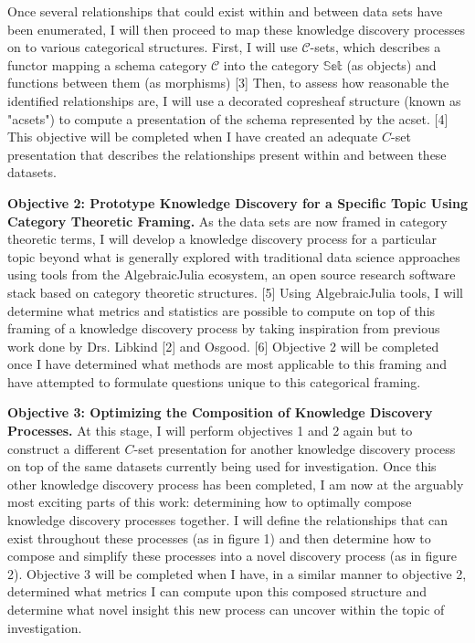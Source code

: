 \documentclass[11pt]{extarticle}
\begin{document}
Once several relationships that could exist within and between data sets have been enumerated, I will then proceed to map these knowledge discovery processes on to various categorical structures.
First, I will use $\mathscr{C}$-sets, which describes a functor mapping a schema category $\mathscr{C}$ into the category $\mathbb{Set}$ (as objects) and functions between them (as morphisms) [3]
Then, to assess how reasonable the identified relationships are, I will use a decorated copresheaf structure (known as "acsets") to compute a presentation of the schema represented by the acset. [4]
This objective will be completed when I have created an adequate $C$-set presentation that describes the relationships present within and between these datasets.

\textbf{Objective 2: Prototype Knowledge Discovery for a Specific Topic Using Category Theoretic Framing.} As the data sets are now framed in category theoretic terms, I will develop a knowledge discovery process for a particular topic beyond what is generally explored with traditional data science approaches using tools from the AlgebraicJulia ecosystem, an open source research software stack based on category theoretic structures. [5]
Using AlgebraicJulia tools, I will determine what metrics and statistics are possible to compute on top of this framing of a knowledge discovery process by taking inspiration from previous work done by Drs. Libkind [2] and Osgood. [6]
Objective 2 will be completed once I have determined what methods are most applicable to this framing and have attempted to formulate questions unique to this categorical framing.

\textbf{Objective 3: Optimizing the Composition of Knowledge Discovery Processes.} At this stage, I will perform objectives 1 and 2 again but to construct a different $C$-set presentation for another knowledge discovery process on top of the same datasets currently being used for investigation.
Once this other knowledge discovery process has been completed, I am now at the arguably most exciting parts of this work: determining how to optimally compose knowledge discovery processes together.
I will define the relationships that can exist throughout these processes (as in figure 1) and then determine how to compose and simplify these processes into a novel discovery process (as in figure 2).
Objective 3 will be completed when I have, in a similar manner to objective 2, determined what metrics I can compute upon this composed structure and determine what novel insight this new process can uncover within the topic of investigation.
\end{document}
